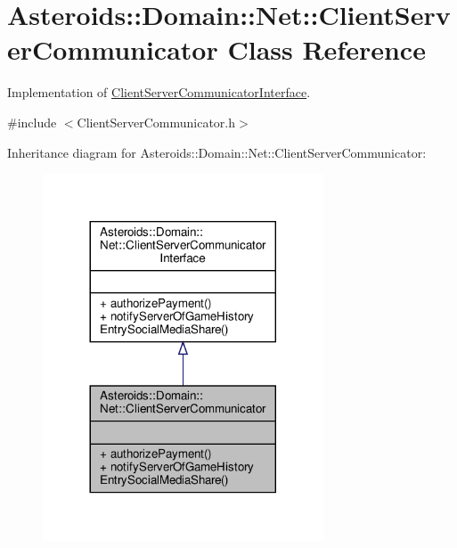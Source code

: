 \hypertarget{classAsteroids_1_1Domain_1_1Net_1_1ClientServerCommunicator}{}\section{Asteroids\+:\+:Domain\+:\+:Net\+:\+:Client\+Server\+Communicator Class Reference}
\label{classAsteroids_1_1Domain_1_1Net_1_1ClientServerCommunicator}


Implementation of \hyperlink{classAsteroids_1_1Domain_1_1Net_1_1ClientServerCommunicatorInterface}{Client\+Server\+Communicator\+Interface}.  




{\ttfamily \#include $<$Client\+Server\+Communicator.\+h$>$}



Inheritance diagram for Asteroids\+:\+:Domain\+:\+:Net\+:\+:Client\+Server\+Communicator\+:\nopagebreak
\begin{figure}[H]
\begin{center}
\leavevmode
\includegraphics[width=236pt]{classAsteroids_1_1Domain_1_1Net_1_1ClientServerCommunicator__inherit__graph}
\end{center}
\end{figure}


